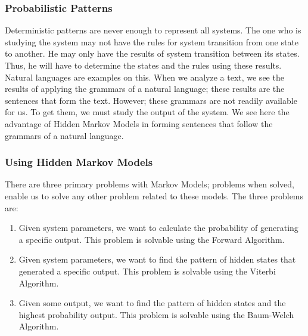 \documentclass{acm_proc_article-sp}
\begin{document}
\subsubsection{Probabilistic Patterns}\label{Probabilistic-Patterns}
Deterministic patterns are never enough to represent all systems. The one who is studying the system may not have the rules for system transition from one state to another. He may only have the results of system transition between its states. Thus, he will have to determine the states and the rules using these results. Natural languages are examples on this. When we analyze a text, we see the results of applying the grammars of a natural language; these results are the sentences that form the text. However; these grammars are not readily available for us. To get them, we must study the output of the system. We see here the advantage of Hidden Markov Models in forming sentences that follow the grammars of a natural language.

\subsubsection{Using Hidden Markov Models}\label{Using-Hidden-Markov-Models}
There are three primary problems with Markov Models; problems when solved, enable us to solve any other problem related to these models. The three problems are:
\begin{enumerate}
    \item Given system parameters, we want to calculate the probability of generating a specific output. This problem is solvable using the Forward Algorithm.
    \item Given system parameters, we want to find the pattern of hidden states that generated a specific output. This problem is solvable using the Viterbi Algorithm.
    \item Given some output, we want to find the pattern of hidden states and the highest probability output. This problem is solvable using the Baum-Welch Algorithm.
\end{enumerate}
\end{document}
